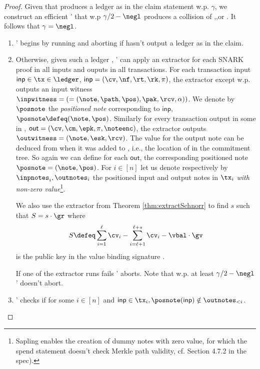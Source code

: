 \documentclass[11pt]{article}
\numberwithin{equation}{section} %
\numberwithin{figure}{section} %
\newcommand{\inp}{\ensuremath{\mathsf{inp}}\xspace}
\newcommand{\out}{\ensuremath{\mathsf{out}}\xspace}
\begin{document}
 \begin{proof}
 Given \adv that produces a ledger as in the claim statement w.p. $\gamma$, we construct an efficient \adv' that
 w.p $\gamma/2-\negl$ produces a collision of \IVK,\notecom,\treehash or \valcom.
 It follows that $\gamma =\negl$.
\begin{enumerate}
\item \adv' begins by running \adv and aborting if \adv hasn't output a ledger as in the claim.
\item Otherwise, given such a ledger \ledger, \adv' can apply an extractor for each SNARK proof in all inputs and ouputs in all transactions.
 For each transaction input $\inp\in \tx\in \ledger$, $\inp=(\cv,\nf,\rt,\rk,\pi)$, the extractor except w.p. \negl 
 outputs an input witness $\inpwitness = (=(\note,\path,\pos),\pak,\rcv,\alpha))$.
 We denote by $\posnote$ the \emph{positioned note} corresponding to \inp, $\posnote \defeq (\note,\pos)$.
 Similarly for every transaction output in some \tx in \ledger, $\out = (\cv,\cm,\epk,\pi,\noteenc)$,
 the extractor outputs $\outwitness= (\note,\esk,\rcv)$. The value \pos for the output note can be deduced from when it was added to \ledger,
 i.e., the location of \cm in the commitment tree.
 So again we can define for each \out, the corresponding positioned note $\posnote = (\note,\pos)$.
For $i\in [n]$ let us denote respectively by $\inpnotes_i,\outnotes_i$ the positioned input and output notes in $\tx_i$ \emph{with non-zero value}\footnote{Sapling enables the creation of dummy notes with zero value, for which the spend statement doesn't check Merkle path validity, cf. Section 4.7.2 in the spec).}.


We also use the extractor from Theorem \ref{thm:extractSchnorr} to find $s$ such that $S=s\cdot \gr$
where
\[S\defeq\sum_{i=1}^\ell \cv_i - \sum_{i=\ell+1}^{\ell+s}\cv_i-\vbal\cdot \gv\]
is the public key in the value binding signature \sigval.

If one of the extractor runs fails \adv' aborts. Note that w.p. at least $\gamma/2 -\negl$ \adv' doesn't abort.

\item  \adv' checks if for some $i\in [n]$ and $\inp\in \tx_i, \posnote(\inp)\notin \outnotes_{<i}$.


\end{enumerate}
\end{proof}
\end{document}
